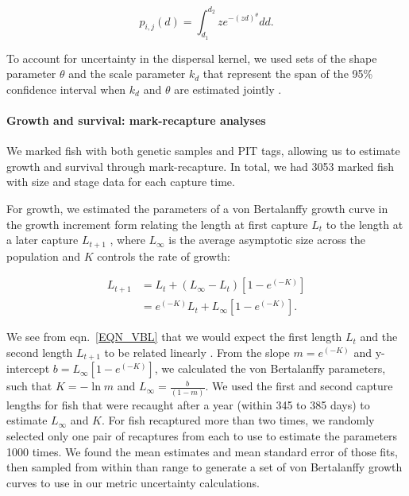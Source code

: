 \documentclass[12pt, oneside]{article}   	%
\begin{document}
\begin{equation} %
p_{i, j}(d) = \int_{d_1}^{d_2} z e^{-(zd)^\theta}  dd. \label{EQN_integratingDK}
\end{equation}

To account for uncertainty in the dispersal kernel, we used sets of the shape parameter $\theta$ and the scale parameter $k_d$ that represent the span of the 95\% confidence interval when $k_d$ and $\theta$ are estimated jointly \citep{catalanoInPrepconnectivity}.

\paragraph*{Growth and survival: mark-recapture analyses}

We marked fish with both genetic samples and PIT tags, allowing us to estimate growth and survival through mark-recapture. In total, we had 3053 marked fish with size and stage data for each capture time. 

For growth, we estimated the parameters of a von Bertalanffy growth curve \citep{fabens1965properties} in the growth increment form relating the length at first capture $L_t$ to the length at a later capture $L_{t+1}$ \citep{hart2009estimating}, where $L_\infty$ is the average asymptotic size across the population and $K$ controls the rate of growth: %

\begin{equation} \label{EQN_VBL} 
\begin{split}
L_{t+1} & = L_t + (L_\infty - L_t)[1 - e^{(-K)}] \\
 & = e^{(-K)}L_t + L_\infty[1 - e^{(-K)}].
\end{split}
\end{equation}

We see from eqn.\ \ref{EQN_VBL} that we would expect the first length $L_t$ and the second length $L_{t+1}$ to be related linearly \citep{hart2009estimating}. From the slope $m = e^{(-K)}$ and y-intercept $b = L_\infty[1 - e^{(-K)}]$, we calculated the von Bertalanffy parameters, such that $K = -\ln m$ and $L_\infty = \frac{b}{(1-m)}$. We used the first and second capture lengths for fish that were recaught after a year (within 345 to 385 days) to estimate $L_\infty$ and $K$. For fish recaptured more than two times, we randomly selected only one pair of recaptures from each to use to estimate the parameters 1000 times. We found the mean estimates and mean standard error of those fits, then sampled from within than range to generate a set of von Bertalanffy growth curves to use in our metric uncertainty calculations. 
\end{document}
